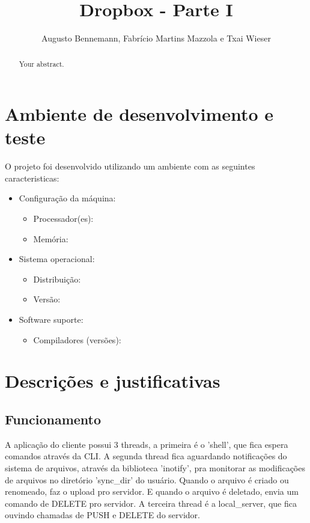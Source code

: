 \documentclass[a4paper]{article}
\title{Dropbox - Parte I}
\author{Augusto Bennemann, Fabrício Martins Mazzola e Txai Wieser}
\begin{document}
\maketitle

\begin{abstract}
Your abstract.
\end{abstract}

\section{Ambiente de desenvolvimento e teste}

O projeto foi desenvolvido utilizando um ambiente com as seguintes caracteristicas:
\begin{itemize}
	\item Configuração da máquina:
	\begin{itemize}
		\item Processador(es):
		\item Memória:
	\end{itemize}

	\item{Sistema operacional}: 
	\begin{itemize}
		\item Distribuição:
		\item Versão:
	\end{itemize}

	\item Software suporte:
	\begin{itemize}
		\item Compiladores (versões):
	\end{itemize}
\end{itemize}

\section{Descrições e justificativas}

\subsection{Funcionamento}

A aplicação do cliente possui 3 threads, a primeira é o 'shell', que fica espera comandos através da CLI.
A segunda thread fica aguardando notificações do sistema de arquivos, através da biblioteca 'inotify', pra monitorar as modificações de arquivos no diretório 'sync\_dir' do usuário. Quando o arquivo é criado ou renomeado, faz o upload pro servidor. E quando o arquivo é deletado, envia um comando de DELETE pro servidor.
A terceira thread é a local\_server, que fica ouvindo chamadas de PUSH e DELETE do servidor.
\end{document}
